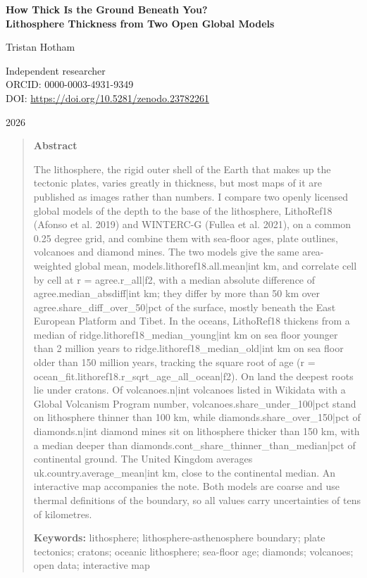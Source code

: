 \documentclass[11pt,a4paper]{article}
\begin{document}
\begin{center}
{\Large\bfseries How Thick Is the Ground Beneath You?\\[2pt] Lithosphere Thickness from Two Open Global Models\par}
\vspace{1.2em}
{\large Tristan Hotham\par}
\vspace{0.3em}
{\small Independent researcher\\
ORCID: 0000-0003-4931-9349\\
DOI: \href{https://doi.org/10.5281/zenodo.23782261}{https://doi.org/10.5281/zenodo.23782261}\par}
\vspace{0.8em}
2026
\end{center}

\begin{quote}
\small
\begin{center}\textbf{Abstract}\end{center}
The lithosphere, the rigid outer shell of the Earth that makes up the tectonic plates, varies greatly in thickness, but most maps of it are published as images rather than numbers. I compare two openly licensed global models of the depth to the base of the lithosphere, LithoRef18 (Afonso et al. 2019) and WINTERC-G (Fullea et al. 2021), on a common 0.25 degree grid, and combine them with sea-floor ages, plate outlines, volcanoes and diamond mines. The two models give the same area-weighted global mean, {{models.lithoref18.all.mean|int}} km, and correlate cell by cell at r = {{agree.r_all|f2}}, with a median absolute difference of {{agree.median_absdiff|int}} km; they differ by more than 50 km over {{agree.share_diff_over_50|pct}} of the surface, mostly beneath the East European Platform and Tibet. In the oceans, LithoRef18 thickens from a median of {{ridge.lithoref18_median_young|int}} km on sea floor younger than 2 million years to {{ridge.lithoref18_median_old|int}} km on sea floor older than 150 million years, tracking the square root of age (r = {{ocean_fit.lithoref18.r_sqrt_age_all_ocean|f2}}). On land the deepest roots lie under cratons. Of {{volcanoes.n|int}} volcanoes listed in Wikidata with a Global Volcanism Program number, {{volcanoes.share_under_100|pct}} stand on lithosphere thinner than 100 km, while {{diamonds.share_over_150|pct}} of {{diamonds.n|int}} diamond mines sit on lithosphere thicker than 150 km, with a median deeper than {{diamonds.cont_share_thinner_than_median|pct}} of continental ground. The United Kingdom averages {{uk.country.average_mean|int}} km, close to the continental median. An interactive map accompanies the note. Both models are coarse and use thermal definitions of the boundary, so all values carry uncertainties of tens of kilometres.

\textbf{Keywords:} lithosphere; lithosphere-asthenosphere boundary; plate tectonics; cratons; oceanic lithosphere; sea-floor age; diamonds; volcanoes; open data; interactive map
\end{quote}
\end{document}
